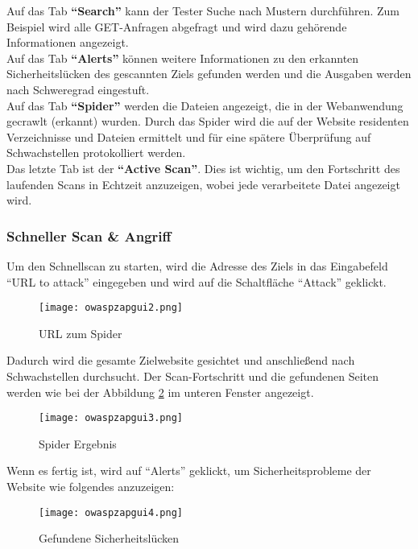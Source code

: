 Auf das Tab \textbf{"`Search"'} kann der Tester Suche nach Mustern durchführen. Zum Beispiel wird alle GET-Anfragen abgefragt und wird dazu gehörende Informationen angezeigt.\\

Auf das Tab \textbf{"`Alerts"'} können weitere Informationen zu den erkannten Sicherheitslücken des gescannten Ziels gefunden werden und die Ausgaben werden nach Schweregrad eingestuft.\\

Auf das Tab \textbf{"`Spider"'} werden die Dateien angezeigt, die in der Webanwendung gecrawlt (erkannt) wurden. Durch das Spider wird die auf der Website residenten Verzeichnisse und Dateien ermittelt und für eine spätere Überprüfung auf Schwachstellen protokolliert werden.\\

Das letzte Tab ist der \textbf{"`Active Scan"'}. Dies ist wichtig, um den Fortschritt des laufenden Scans in Echtzeit anzuzeigen, wobei jede verarbeitete Datei angezeigt wird.\\

\subsubsection{Schneller Scan \& Angriff}

Um den Schnellscan zu starten, wird die Adresse des Ziels in das Eingabefeld "`URL to attack"' eingegeben und wird auf die Schaltfläche "`Attack"' geklickt.

\begin{figure}[h]
	\centering
	\texttt{[image: owaspzapgui2.png]}
	\caption{URL zum Spider}
	\label{quickscan2}
\end{figure}

Dadurch wird die gesamte Zielwebsite gesichtet und anschließend nach Schwachstellen durchsucht. Der Scan-Fortschritt und die gefundenen Seiten werden wie bei der Abbildung \ref{quickscan3} im unteren Fenster angezeigt.

\newpage

\begin{figure}[h]
	\centering
	\texttt{[image: owaspzapgui3.png]}
	\caption{Spider Ergebnis}
	\label{quickscan3}
\end{figure}

Wenn es fertig ist, wird auf "`Alerts"' geklickt, um Sicherheitsprobleme der Website wie folgendes anzuzeigen:

\begin{figure}[h]
	\centering
	\texttt{[image: owaspzapgui4.png]}
	\caption{Gefundene Sicherheitslücken}
	\label{quickscan4}
\end{figure}

